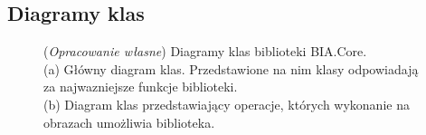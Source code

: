 \documentclass{article}
\begin{document}
        \subsection{Diagramy klas}
        \begin{figure}[H]
            \centering
            \qquad
            \caption
            {
                (\textit{Opracowanie własne}) Diagramy klas biblioteki BIA.Core.\\
                (a) Główny diagram klas. Przedstawione na nim klasy odpowiadają za najwazniejsze funkcje biblioteki.\\
                (b) Diagram klas przedstawiający operacje, których wykonanie na obrazach umożliwia biblioteka.
            }
            \label{class_diagram}
        \end{figure}
\end{document}
